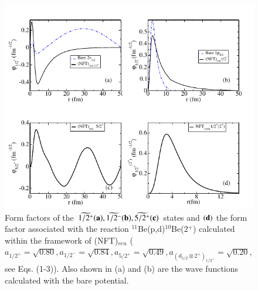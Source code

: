       \begin{figure}
      \centerline{\includegraphics*[width=16cm,angle=0]{C8/figsC8/fig6_2_4}}
      	\caption{ Form factors  of the $\widetilde {1/2^+} {\bf (a)}, \widetilde{1/2^-} {\bf (b)}, \widetilde{5/2^+} {\bf (c)}$ 
      	states  and ${\bf (d)}$ the form factor associated with the reaction
      	$^{11}$Be(p,d)$^{10}$Be(2$^+$)
      	calculated within the framework of (NFT)$_{ren }$ 
      	($a_{1/2^+} = \sqrt{0.80},
      	a_{1/2^-} = \sqrt{0.84}, a_{5/2^+} = \sqrt{0.49}, a_{(d_{5/2}\otimes 2^+)_{1/2^+}} = \sqrt{0.20}$, see Eqs. (1-3)).
      	Also shown in (a) and (b) are 
      	the wave functions calculated with the bare potential.
      	}\label{fig6.2.4}
      \end{figure} 

